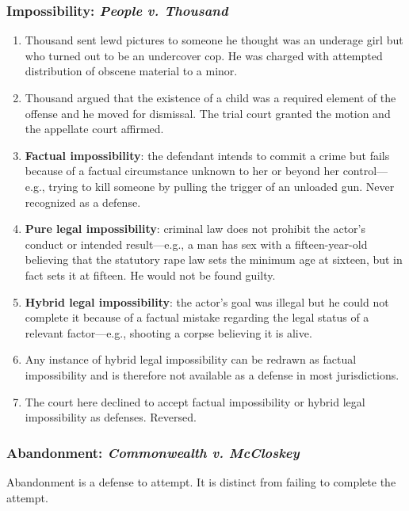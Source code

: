\subsubsection{Impossibility: \emph{People v. Thousand}}

\begin{enumerate}
    \item Thousand sent lewd pictures to someone he thought was an underage 
    girl but who turned out to be an undercover cop. He was charged with 
    attempted distribution of obscene material to a minor.
    \item Thousand argued that the existence of a child was a required element 
    of the offense and he moved for dismissal. The trial court granted the 
    motion and the appellate court affirmed.
    \item \textbf{Factual impossibility}: the defendant intends to commit a 
    crime but fails because of a factual circumstance unknown to her or beyond 
    her control---e.g., trying to kill someone by pulling the trigger of an 
    unloaded gun. Never recognized as a defense.
    \item \textbf{Pure legal impossibility}: criminal law does not prohibit the 
    actor's conduct or intended result---e.g., a man has sex with a 
    fifteen-year-old believing that the statutory rape law sets the minimum 
    age at sixteen, but in fact sets it at fifteen. He would not be found 
    guilty.
    \item \textbf{Hybrid legal impossibility}: the actor's goal was illegal but 
    he could not complete it because of a factual mistake regarding the legal 
    status of a relevant factor---e.g., shooting a corpse believing it is 
    alive.
    \item Any instance of hybrid legal impossibility can be redrawn as factual 
    impossibility and is therefore not available as a defense in most 
    jurisdictions.
    \item The court here declined to accept factual impossibility or hybrid 
    legal impossibility as defenses. Reversed.
\end{enumerate}

\subsubsection{Abandonment: \emph{Commonwealth v. McCloskey}}

Abandonment is a defense to attempt. It is distinct from failing to complete 
the attempt.

